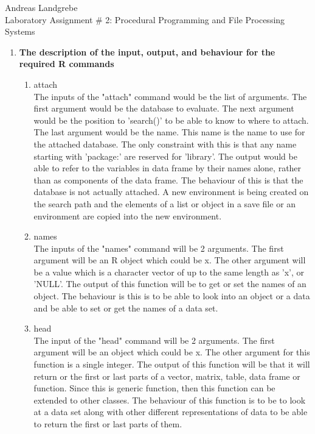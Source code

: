 \documentclass{article}
\begin{document}
\noindent
Andreas Landgrebe
\\
Laboratory Assignment \# 2: Procedural Programming and File Processing Systems
\\
\begin{enumerate}
\item\textbf{{ The description of the input, output, and behaviour for the required R commands}}
\begin{enumerate}
\item {attach} 
\\
The inputs of the "attach" command would be the list of arguments. The first argument would be the database to evaluate. The next argument would be the position to 'search()' to be able to know to where to attach. The last argument would be the name. This name is the name to use for the attached database. The only constraint with this is that any name starting with 'package:' are reserved for 'library'. The output would be able to refer to the variables in data frame by their names alone, rather than as components of the data frame. The behaviour of this is that the database is not actually attached. A new environment is being created on the search path and the elements of a list or object in a save file or an environment are copied into the new environment.
\\
\item {names} 
\\
The inputs of the "names" command will be 2 arguments. The first argument will be an R object which could be x. The other argument will be a value which is a character vector of up to the same length as 'x', or 'NULL'. The output of this function will be to get or set the names of an object. The behaviour is this is to be able to look into an object or a data and be able to set or get the names of a data set.
\\
\item {head}
\\
The input of the "head" command will be 2 arguments. The first argument will be an object which could be x. The other argument for this function is a single integer. The output of this function will be that it will return or the first or last parts of a vector, matrix, table, data frame or function. Since this is generic function, then this function can be extended to other classes. The behaviour of this function is to be to look at a data set along with other different representations of data to be able to return the first or last parts of them.
\\

\end{enumerate}
\end{enumerate}
\end{document}
